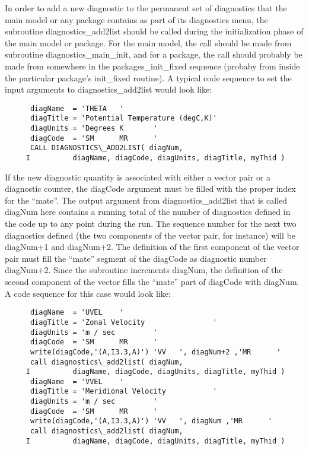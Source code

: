 \noindent
In order to add a new diagnostic to the permanent set of diagnostics
that the main model or any package contains as part of its diagnostics
menu, the subroutine diagnostics\_add2list should be called during the
initialization phase of the main model or package. For the main model,
the call should be made from subroutine diagnostics\_main\_init, and
for a package, the call should probably be made from somewhere in the
packages\_init\_fixed sequence (probaby from inside the particular
package's init\_fixed routine). A typical code sequence to set the
input arguments to diagnostics\_add2list would look like:

\begin{verbatim}
      diagName  = 'THETA   '
      diagTitle = 'Potential Temperature (degC,K)'
      diagUnits = 'Degrees K       '
      diagCode  = 'SM      MR      '
      CALL DIAGNOSTICS\_ADD2LIST( diagNum,
     I          diagName, diagCode, diagUnits, diagTitle, myThid )
\end{verbatim}

\noindent If the new diagnostic quantity is associated with either a
vector pair or a diagnostic counter, the diagCode argument must be
filled with the proper index for the ``mate''. The output argument
from diagnostics\_add2list that is called diagNum here contains a
running total of the number of diagnostics defined in the code up to
any point during the run. The sequence number for the next two
diagnostics defined (the two components of the vector pair, for
instance) will be diagNum+1 and diagNum+2. The definition of the first
component of the vector pair must fill the ``mate'' segment of the
diagCode as diagnostic number diagNum+2.  Since the subroutine
increments diagNum, the definition of the second component of the
vector fills the ``mate'' part of diagCode with diagNum. A code
sequence for this case would look like:

\begin{verbatim}
      diagName  = 'UVEL    ' 
      diagTitle = 'Zonal Velocity                ' 
      diagUnits = 'm / sec         ' 
      diagCode  = 'SM      MR      ' 
      write(diagCode,'(A,I3.3,A)') 'VV   ', diagNum+2 ,'MR      ' 
      call diagnostics\_add2list( diagNum, 
     I          diagName, diagCode, diagUnits, diagTitle, myThid ) 
      diagName  = 'VVEL    ' 
      diagTitle = 'Meridional Velocity           ' 
      diagUnits = 'm / sec         ' 
      diagCode  = 'SM      MR      ' 
      write(diagCode,'(A,I3.3,A)') 'VV   ', diagNum ,'MR      ' 
      call diagnostics\_add2list( diagNum, 
     I          diagName, diagCode, diagUnits, diagTitle, myThid ) 
\end{verbatim}

